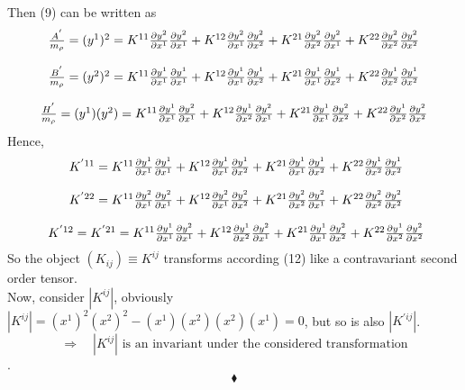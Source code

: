  Then (9) can be written as
 \begin {align}
\begin{array}{c}
\frac{A^{'}}{m_{\rho}} = (y^1)^2 =  K^{11}\pdv{y^2}{x^1} \pdv{y^2}{x^1}  +  K^{12}\pdv{y^2}{x^1}\pdv{y^2}{x^2} + K^{21}\pdv{y^2}{x^2}\pdv{y^2}{x^1} + K^{22}\pdv{y^2}{x^2}\pdv{y^2}{x^2}\\\\
\frac{B^{'}}{m_{\rho}} = (y^2)^2 =  K^{11}\pdv{y^1}{x^1} \pdv{y^1}{x^1}  +  K^{12}\pdv{y^1}{x^1}\pdv{y^1}{x^2} + K^{21}\pdv{y^1}{x^1}\pdv{y^1}{x^2} + K^{22}\pdv{y^1}{x^2}\pdv{y^1}{x^2}\\\\
\frac{H^{'}}{m_{\rho}} = (y^1)(y^2)  = K^{11}\pdv{y^1}{x^1} \pdv{y^2}{x^1}  +  K^{12}\pdv{y^1}{x^2}\pdv{y^2}{x^1} + K^{21}\pdv{y^1}{x^1}\pdv{y^2}{x^2} + K^{22}\pdv{y^1}{x^2}\pdv{y^2}{x^2}
  \end{array}
  \end{align}
  Hence,
  \begin{align}
\begin{array}{c}
  \ K^{'11}  =  K^{11}\pdv{y^1}{x^1} \pdv{y^1}{x^1}  +  K^{12}\pdv{y^1}{x^1}\pdv{y^1}{x^2} + K^{21}\pdv{y^1}{x^1}\pdv{y^1}{x^2} + K^{22}\pdv{y^1}{x^2}\pdv{y^1}{x^2}\\\\
\ K^{'22} =  K^{11}\pdv{y^2}{x^1} \pdv{y^2}{x^1}  +  K^{12}\pdv{y^2}{x^1}\pdv{y^2}{x^2} + K^{21}\pdv{y^2}{x^2}\pdv{y^2}{x^1} + K^{22}\pdv{y^2}{x^2}\pdv{y^2}{x^2}\\\\
 \ K^{'12} = K^{'21} = K^{11}\pdv{y^1}{x^1} \pdv{y^2}{x^1}  +  K^{12}\pdv{y^1}{x^2}\pdv{y^2}{x^1} + K^{21}\pdv{y^1}{x^1}\pdv{y^2}{x^2} + K^{22}\pdv{y^1}{x^2}\pdv{y^2}{x^2}
  \end{array}
\end{align}
So the object $(K_{ij})\equiv K^{ij}$ transforms according (12) like a contravariant second order tensor.\\

Now, consider $|K^{ij}|$, obviously $|K^{ij}| = (x^1)^2(x^2)^2-(x^1)(x^2)(x^2)(x^1) =0$, but so is also $|K^{'ij}|$.
$$\Rightarrow\quad |K^{ij}| \text{ is an invariant under the considered transformation}$$. 
$$\blacklozenge$$
\pagebreak[4]

